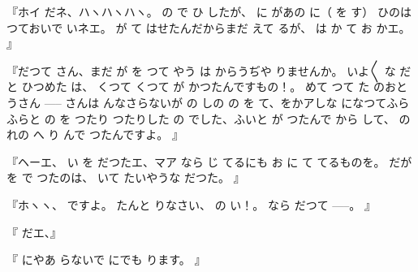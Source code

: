 『ホイ
だネ、ハヽハヽハヽ。
の
で
ひ
したが、
に
があの
に（
を
す）
ひのは
つておいで\ninojiten{}
いネエ。
が
て\ninojiten{}
はせたんだからまだ
えて
るが、
は
か
て
お
かエ。
』

『だつて
さん、まだ
が
を
つて
やう
は
からうぢや
りませんか。
いよ〳〵
な
だと
ひつめた
は、
くつて
くつて
が
かつたんですもの！。
めて
つて
た
のおとうさん \------
さんは
んなさらないが
の
しの
の
を
て、をかアしな
になつてふらふらと
の
を
つたり
つたりした
の
でした、ふいと
が
つたんで
から
して、
の
れの
へ
り
んで
つたんですよ。
』

『ヘーエ、
い
を
だつたエ、マア
なら
じ
てるにも
お
に
て
てるものを。
だが
を
で
つたのは、
いて
たいやうな
だつた。
』

『ホヽヽ、
ですよ。
たんと
りなさい、
の
い！。
なら
だつて \------。
』

『
だエ、』

『
にやあ
らないで
にでも
ります。
』

